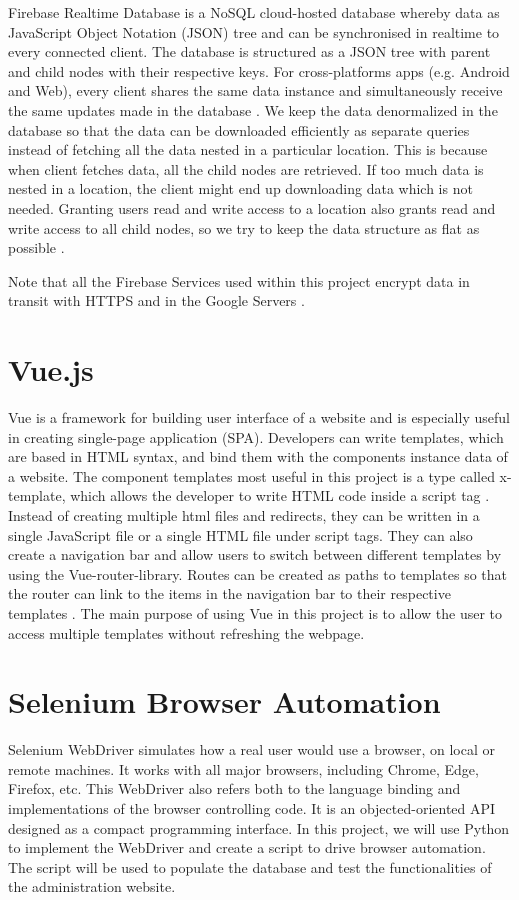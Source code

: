 \documentclass[../report.tex]{subfiles}
\begin{document}
Firebase Realtime Database is a NoSQL cloud-hosted database whereby data as JavaScript Object Notation (JSON) tree and can be synchronised in realtime to every connected client. The database is structured as a JSON tree with parent and child nodes with their respective keys. For cross-platforms apps (e.g. Android and Web), every client shares the same data instance and simultaneously receive the same updates made in the database \cite{firebase-realtime-database}. We keep the data denormalized in the database so that the data can be downloaded efficiently as separate queries instead of fetching all the data nested in a particular location. This is because when client fetches data, all the child nodes are retrieved. If too much data is nested in a location, the client might end up downloading data which is not needed. Granting users read and write access to a location also grants read and write access to all child nodes, so we try to keep the data structure as flat as possible \cite{firebase-database-structure}.

Note that all the Firebase Services used within this project encrypt data in transit with HTTPS and in the Google Servers \cite{firebase-database-security}.

\section{Vue.js}
Vue is a framework for building user interface of a website and is especially useful in creating single-page application (SPA). Developers can write templates, which are based in HTML syntax, and bind them with the components instance data of a website. The component templates most useful in this project is a type called x-template, which allows the developer to write HTML code inside a script tag \cite{vue-js}. Instead of creating multiple html files and redirects, they can be written in a single JavaScript file or a single HTML file under script tags. They can also create a navigation bar and allow users to switch between different templates by using the Vue-router-library. Routes can be created as paths to templates so that the router can link to the items in the navigation bar to their respective templates \cite{vue-js-routing}. The main purpose of using Vue in this project is to allow the user to access multiple templates without refreshing the webpage.

\section{Selenium Browser Automation}
Selenium WebDriver simulates how a real user would use a browser, on local or remote machines. It works with all major browsers, including Chrome, Edge, Firefox, etc. This WebDriver also refers both to the language binding and implementations of the browser controlling code. It is an objected-oriented API designed as a compact programming interface. In this project, we will use Python to implement the WebDriver and create a script to drive browser automation. The script will be used to populate the database and test the functionalities of the administration website.
\end{document}
